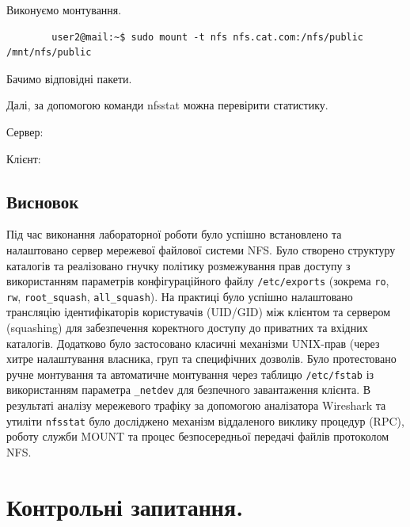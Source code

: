 \documentclass[14pt, a4paper]{extreport}
\begin{document}
	Виконуємо монтування. \sideat{[VM 2]}
	
	\begin{verbatim}
		user2@mail:~$ sudo mount -t nfs nfs.cat.com:/nfs/public /mnt/nfs/public
	\end{verbatim}
	
	Бачимо відповідні пакети.
	
	
	Далі, за допомогою команди nfsstat можна перевірити статистику.
	
	Сервер: \sideat{[VM 1]}
	
	
	Клієнт: \sideat{[VM 2]}
	
	
	\subsection*{Висновок}
	
	Під час виконання лабораторної роботи було успішно встановлено та налаштовано сервер мережевої файлової системи NFS. Було створено структуру каталогів та реалізовано гнучку політику розмежування прав доступу з використанням параметрів конфігураційного файлу \texttt{/etc/exports} (зокрема \texttt{ro}, \texttt{rw}, \texttt{root\_squash}, \texttt{all\_squash}). На практиці було успішно налаштовано трансляцію ідентифікаторів користувачів (UID/GID) між клієнтом та сервером (squashing) для забезпечення коректного доступу до приватних та вхідних каталогів. Додатково було застосовано класичні механізми UNIX-прав (через хитре налаштування власника, груп та специфічних дозволів. Було протестовано ручне монтування та автоматичне монтування через таблицю \texttt{/etc/fstab} із використанням параметра \texttt{\_netdev} для безпечного завантаження клієнта. В результаті аналізу мережевого трафіку за допомогою аналізатора Wireshark та утиліти \texttt{nfsstat} було досліджено механізм віддаленого виклику процедур (RPC), роботу служби MOUNT та процес безпосередньої передачі файлів протоколом NFS.
	
	\section*{Контрольні запитання.}
	
\end{document}
